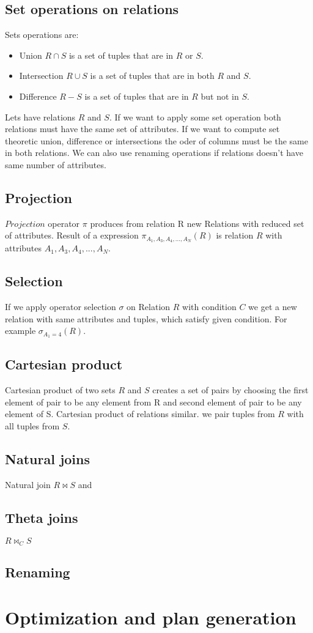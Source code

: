 \subsection{Set operations on relations}

Sets operations are:
\begin{itemize}
\item Union $R\cap S$ is a set of tuples that are in $R$ or $S$.
\item Intersection $R\cup S$  is a set of tuples that are in both $R$ and $S$. 
\item Difference $R-S$ is a set of tuples that are in $R$ but not in $S$.

\end{itemize}

Lets have relations $R$ and $S$. If we want to apply some set operation both relations must have the same set of attributes. If we want to compute set theoretic union, difference or intersections the oder of columns must be the same in both relations. 
We can also use renaming operations if relations doesn't have same number of attributes.

\subsection{Projection}

$Projection$ operator $\pi$ produces from relation R new Relations with reduced set of attributes. Result of a expression $\pi_{A_1,A_3,A_4,...,A_N}(R)$ is relation $R$ with attributes $A_1,A_3,A_4,...,A_N$. 

\subsection{Selection}
If we apply operator selection $\sigma$ on Relation $R$ with condition $C$ we get a new relation with same attributes and tuples, which satisfy given condition. For example $\sigma_{A_1=4}(R)$.

\subsection{Cartesian product}
Cartesian product of two sets $R$ and $S$ creates a set of pairs by choosing the first element of pair to be any element from R and second element of pair to be any element of S. Cartesian product of relations similar. we pair tuples from $R$ with all tuples from $S$.

\subsection{Natural joins}
Natural join $R\Join S$ and

\subsection{Theta joins}
$R\Join_C S$
\subsection{Renaming}


\section{Optimization and plan generation}
